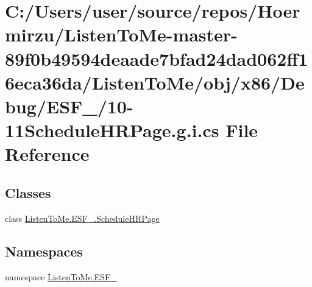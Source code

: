 \hypertarget{10-11_schedule_h_r_page_8g_8i_8cs}{}\section{C\+:/\+Users/user/source/repos/\+Hoermirzu/\+Listen\+To\+Me-\/master-\/89f0b49594deaade7bfad24dad062ff16eca36da/\+Listen\+To\+Me/obj/x86/\+Debug/\+E\+S\+F\+\_/10-\/11\+Schedule\+H\+R\+Page.g.\+i.\+cs File Reference}
\label{10-11_schedule_h_r_page_8g_8i_8cs}
\subsection*{Classes}
\begin{DoxyCompactItemize}
\item 
class \hyperlink{class_listen_to_me_1_1_e_s_f__2_1_1_schedule_h_r_page}{Listen\+To\+Me.\+E\+S\+F\+\_.\+Schedule\+H\+R\+Page}
\end{DoxyCompactItemize}
\subsection*{Namespaces}
\begin{DoxyCompactItemize}
\item 
namespace \hyperlink{namespace_listen_to_me_1_1_e_s_f__2}{Listen\+To\+Me.\+E\+S\+F\+\_}
\end{DoxyCompactItemize}
